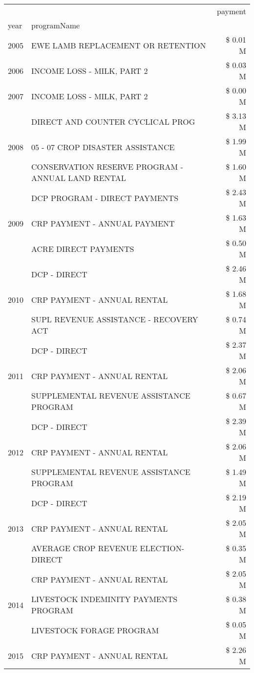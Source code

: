 \begin{tabular}{llr}
\toprule
 &  & payment \\
year & programName &  \\
\midrule
2005 & EWE LAMB REPLACEMENT OR RETENTION & \$ 0.01 M \\
\cline{1-3}
2006 & INCOME LOSS - MILK, PART 2 & \$ 0.03 M \\
\cline{1-3}
2007 & INCOME LOSS - MILK, PART 2 & \$ 0.00 M \\
\cline{1-3}
\multirow[t]{3}{*}{2008} & DIRECT AND COUNTER CYCLICAL PROG & \$ 3.13 M \\
 & 05 - 07 CROP DISASTER ASSISTANCE & \$ 1.99 M \\
 & CONSERVATION RESERVE PROGRAM - ANNUAL LAND RENTAL & \$ 1.60 M \\
\cline{1-3}
\multirow[t]{3}{*}{2009} & DCP PROGRAM - DIRECT PAYMENTS & \$ 2.43 M \\
 & CRP PAYMENT - ANNUAL PAYMENT & \$ 1.63 M \\
 & ACRE DIRECT PAYMENTS & \$ 0.50 M \\
\cline{1-3}
\multirow[t]{3}{*}{2010} & DCP - DIRECT & \$ 2.46 M \\
 & CRP PAYMENT - ANNUAL RENTAL & \$ 1.68 M \\
 & SUPL REVENUE ASSISTANCE - RECOVERY ACT & \$ 0.74 M \\
\cline{1-3}
\multirow[t]{3}{*}{2011} & DCP - DIRECT & \$ 2.37 M \\
 & CRP PAYMENT - ANNUAL RENTAL & \$ 2.06 M \\
 & SUPPLEMENTAL REVENUE ASSISTANCE PROGRAM & \$ 0.67 M \\
\cline{1-3}
\multirow[t]{3}{*}{2012} & DCP - DIRECT & \$ 2.39 M \\
 & CRP PAYMENT - ANNUAL RENTAL & \$ 2.06 M \\
 & SUPPLEMENTAL REVENUE ASSISTANCE PROGRAM & \$ 1.49 M \\
\cline{1-3}
\multirow[t]{3}{*}{2013} & DCP - DIRECT & \$ 2.19 M \\
 & CRP PAYMENT - ANNUAL RENTAL & \$ 2.05 M \\
 & AVERAGE CROP REVENUE ELECTION-DIRECT & \$ 0.35 M \\
\cline{1-3}
\multirow[t]{3}{*}{2014} & CRP PAYMENT - ANNUAL RENTAL & \$ 2.05 M \\
 & LIVESTOCK INDEMINITY PAYMENTS PROGRAM & \$ 0.38 M \\
 & LIVESTOCK FORAGE PROGRAM & \$ 0.05 M \\
\cline{1-3}
\multirow[t]{3}{*}{2015} & CRP PAYMENT - ANNUAL RENTAL & \$ 2.26 M \\

\end{tabular}

